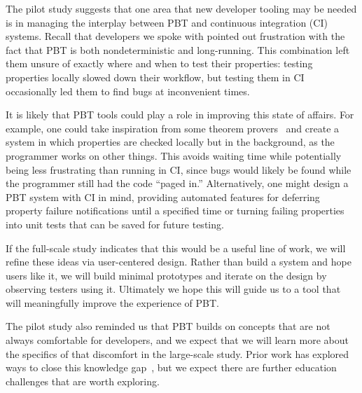  


The pilot study suggests that one area that new developer tooling may be
needed is in managing the interplay between PBT and continuous integration (CI)
systems. Recall that developers we spoke with pointed out frustration with the
fact that PBT is both nondeterministic and long-running. This combination left
them unsure of exactly where and when to test their properties: testing
properties locally slowed down their workflow, but testing them in CI
occasionally led them to find bugs at inconvenient times.

It is likely that PBT tools could play a role in improving this state of
affairs. For example, one could take inspiration from some theorem
provers~\cite{berghofer2004random} and create a system in which properties are
checked locally but in the background, as the programmer works on other things.
This avoids waiting time while potentially being less frustrating than running
in CI, since bugs would likely be found while the programmer still had the code
``paged in.'' Alternatively, one might design a PBT system with CI in mind,
providing automated features for deferring property failure notifications until
a specified time or turning failing properties into unit tests that can be saved
for future testing.

If the full-scale study indicates that this would be a useful line of work, we
will refine these ideas via user-centered design. Rather than build a system and
hope users like it, we will build minimal prototypes and iterate on the design
by observing testers using it. Ultimately we hope this will guide us to a tool
that will meaningfully improve the experience of PBT.



The pilot study also reminded us that PBT builds on concepts that are not
always comfortable for developers, and we expect that we will learn more about
the specifics of that discomfort in the large-scale study.  Prior work has
explored ways to close this knowledge
gap~\cite{wrenn2021using,nelson2021automated}, but we expect there are further
education challenges that are worth exploring.

